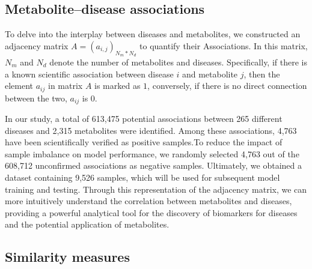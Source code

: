 \documentclass[lettersize,journal]{IEEEtran}
\begin{document}
\subsection{\textbf{Metabolite–disease associations}}
To delve into the interplay between diseases and metabolites, we constructed an adjacency matrix $A = (a_{i,j})_{N_{m}*N_{d}}$ to quantify their Associations. In this matrix, $ N_{m}$ and $N_{d} $ denote the number of metabolites and diseases. Specifically, if there is a known scientific association between disease \(i\) and metabolite \(j\), then the element $a_{ij}$ in matrix \(A\) is marked as \(1\), conversely, if there is no direct connection between the two, $a_{ij}$ is 0.

In our study, a total of 613,475 potential associations between 265 different diseases and 2,315 metabolites were identified. Among these associations, 4,763 have been scientifically verified as positive samples.To reduce the impact of sample imbalance on model performance, we randomly selected 4,763 out of the 608,712 unconfirmed associations as negative samples. Ultimately, we obtained a dataset containing 9,526 samples, which will be used for subsequent model training and testing.
Through this representation of the adjacency matrix, we can more intuitively understand the correlation between metabolites and diseases, providing a powerful analytical tool for the discovery of biomarkers for diseases and the potential application of metabolites.

\subsection{\textbf{Similarity measures}}
\end{document}
